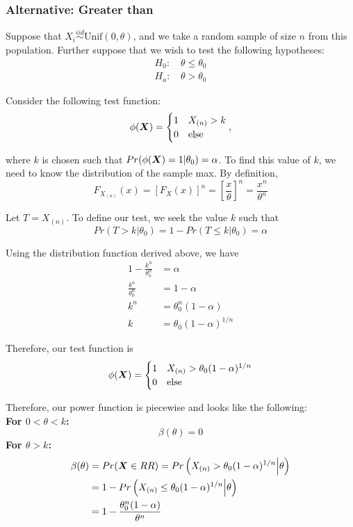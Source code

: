 \documentclass[]{article}
\newcommand{\bfX}{\mbox{\boldmath $X$}}
\begin{document}
\subsubsection{Alternative: Greater than}

Suppose that $X_i \stackrel{iid}{\sim} \text{Unif}(0, \theta)$, and we take a random sample of size $n$ from this population. Further suppose that we wish to test the following hypotheses:
\[
\begin{split}
\text{$H_0$: }& \theta \leq \theta_0 \\
\text{$H_a$: }& \theta > \theta_0
\end{split}
\]

Consider the following test function:
\[
\phi(\bfX) = \begin{cases}
1 & X_{(n)} > k \\
0 & \text{else}
\end{cases},
\]

where $k$ is chosen such that $Pr(\phi(\bfX) = 1|\theta_0) = \alpha$. To find this value of $k$, we need to know the distribution of the sample max. By definition, 
\[
F_{X_{(n)}}(x) = \left[F_X(x)\right]^n = \left[\frac{x}{\theta}\right]^n = \frac{x^n}{\theta^n}
\]


Let $T = X_{(n)}$. To define our test, we seek the value $k$ such that 
\[
Pr(T > k | \theta_0) = 1 - Pr(T \leq k | \theta_0) = \alpha
\]

Using the distribution function derived above, we have
\[
\begin{split}
1 - \frac{k^n}{\theta_0^n} &= \alpha \\
\frac{k^n}{\theta_0^n} &= 1 - \alpha \\
k^n &= \theta_0^n(1-\alpha) \\
k &= \theta_0(1-\alpha)^{1/n}
\end{split}
\]

Therefore, our test function is
\[
\phi(\bfX) = \begin{cases}
1 & X_{(n)} > \theta_0(1-\alpha)^{1/n} \\
0 & \text{else}
\end{cases}
\]

Therefore, our power function is piecewise and looks like the following:\\
\textbf{For $0 < \theta < k$:}
\[
\beta(\theta) = 0
\]
\textbf{For $\theta > k$:}
\[
\begin{split}
\beta(\theta) &= Pr(\bfX \in RR) = Pr\left(X_{(n)} > \theta_0(1-\alpha)^{1/n} \Big| \theta\right) \\
&= 1 - Pr\left(X_{(n)}\leq \theta_0(1-\alpha)^{1/n} \Big| \theta\right) \\
&= 1 - \frac{\theta_0^n(1-\alpha)}{\theta^n}
\end{split}
\]
\end{document}
